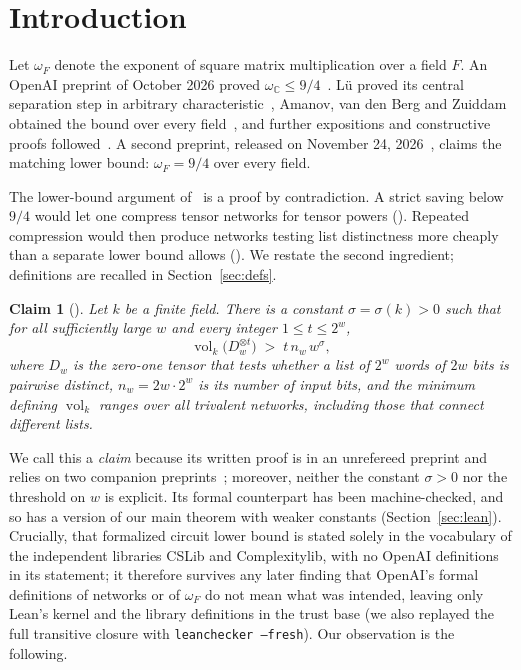 \documentclass[11pt]{article}
\newtheorem{claim}[theorem]{Claim}
\theoremstyle{definition}
\newcommand{\vol}{\operatorname{vol}}
\newcommand{\Dw}{D_w}
\begin{document}
\section{Introduction}

Let $\omega_F$ denote the exponent of square matrix multiplication over a field $F$. An OpenAI preprint of October 2026 proved $\omega_{\mathbb C}\le 9/4$~\cite{OAI-UB}. L\"u proved its central separation step in arbitrary characteristic~\cite{Lu26}, Amanov, van den Berg and Zuiddam obtained the bound over every field~\cite{AvdBZ26}, and further expositions and constructive proofs followed~\cite{DLSW26,Pass26}. A second preprint, released on November 24, 2026~\cite{OAI-MM}, claims the matching lower bound: $\omega_F = 9/4$ over every field.

The lower-bound argument of~\cite{OAI-MM} is a proof by contradiction. A strict saving below $9/4$ would let one compress tensor networks for tensor powers (\cite[Theorem~2.1]{OAI-MM}). Repeated compression would then produce networks testing list distinctness more cheaply than a separate lower bound allows (\cite[Theorem~2.2]{OAI-MM}). We restate the second ingredient; definitions are recalled in Section~\ref{sec:defs}.

\begin{claim}[{\cite[Theorem~2.2]{OAI-MM}}]\label{claim:oai}
Let $k$ be a finite field. There is a constant $\sigma = \sigma(k)>0$ such that for all sufficiently large $w$ and every integer $1\le t\le 2^w$,
\[
  \vol_k\bigl(\Dw^{\otimes t}\bigr) \;>\; t\,n_w\,w^{\sigma},
\]
where $\Dw$ is the zero-one tensor that tests whether a list of $2^w$ words of $2w$ bits is pairwise distinct, $n_w = 2w\cdot 2^w$ is its number of input bits, and the minimum defining $\vol_k$ ranges over all trivalent networks, including those that connect different lists.
\end{claim}

We call this a \emph{claim} because its written proof is in an unrefereed preprint and relies on two companion preprints~\cite{OAI-Euc,OAI-HC}; moreover, neither the constant $\sigma>0$ nor the threshold on $w$ is explicit. Its formal counterpart has been machine-checked, and so has a version of our main theorem with weaker constants (Section~\ref{sec:lean}). Crucially, that formalized circuit lower bound is stated solely in the vocabulary of the independent libraries CSLib and Complexitylib, with no OpenAI definitions in its statement; it therefore survives any later finding that OpenAI's formal definitions of networks or of $\omega_F$ do not mean what was intended, leaving only Lean's kernel and the library definitions in the trust base (we also replayed the full transitive closure with \texttt{leanchecker --fresh}). Our observation is the following.
\end{document}
